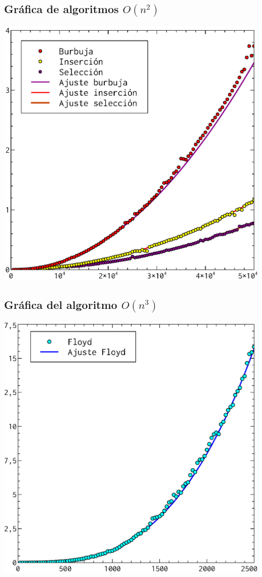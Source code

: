 \documentclass[a4paper, 11pt]{article}
\begin{document}
\subsection{Gráfica de algoritmos $O(n^2)$}
  \includegraphics[]{n2_ajuste}
\subsection{Gráfica del algoritmo $O(n^3)$}
\includegraphics[]{n3_ajuste.eps}
\end{document}
